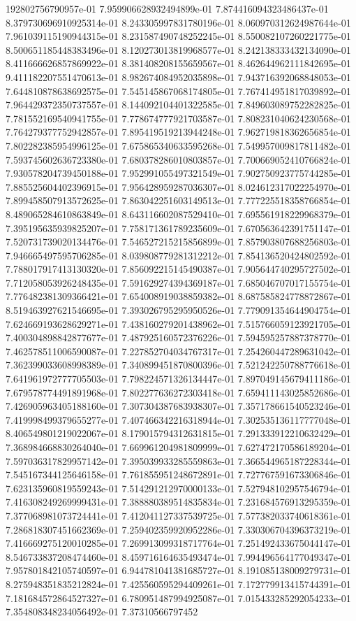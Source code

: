 192802756790957e-01	7.959906628932494899e-01	7.874416094323486437e-01	8.379730696910925314e-01	8.243305997831780196e-01	8.060970312624987644e-01	7.961039115190944315e-01	8.231587490748252245e-01	8.550082107260221775e-01	8.500651185448383496e-01	8.120273013819968577e-01	8.242138333432134090e-01	8.411666626857869922e-01	8.381408208155659567e-01	8.462644962111842695e-01	9.411182207551470613e-01	8.982674084952035898e-01	7.943716392068848053e-01	7.644810878638692575e-01	7.545145867068174805e-01	7.767414951817039892e-01	7.964429372350737557e-01	8.144092104401322585e-01	7.849603089752282825e-01	7.781552169540941755e-01	7.778674777921703587e-01	7.808231040624230568e-01	7.764279377752942857e-01	7.895419519213944248e-01	7.962719818362656854e-01	7.802282385954996125e-01	7.675865340633595268e-01	7.549957009817811482e-01	7.593745602636723380e-01	7.680378286010803857e-01	7.700669052410766824e-01	7.930578204739450188e-01	7.952991055497321549e-01	7.902750923775744285e-01	7.885525604402396915e-01	7.956428959287036307e-01	8.024612317022254970e-01	7.899458507913572625e-01	7.863042251603149513e-01	7.777225518358766854e-01	8.489065284610863849e-01	8.643116602087529410e-01	7.695561918229968379e-01	7.395195635939825207e-01	7.758171361789235609e-01	7.670563642391751147e-01	7.520731739020134476e-01	7.546527215215856899e-01	7.857903807688256803e-01	7.946665497595706285e-01	8.039808779281312212e-01	7.854136520424802592e-01	7.788017917413130320e-01	7.856092215145490387e-01	7.905644740295727502e-01	7.712058053926248435e-01	7.591629274394369187e-01	7.685046707017155754e-01	7.776482381309366421e-01	7.654008919038859382e-01	8.687585824778872867e-01	8.519463927621546695e-01	7.393026795295950526e-01	7.779091354644904754e-01	7.624669193628629271e-01	7.438160279201438962e-01	7.515766059123921705e-01	7.400304898842877677e-01	7.487925160572376226e-01	7.594595257887378770e-01	7.462578511006590087e-01	7.227852704034767317e-01	7.254260447289631042e-01	7.362399033608998389e-01	7.340899451870800396e-01	7.521242250788776618e-01	7.641961972777705503e-01	7.798224571326134447e-01	7.897049145679411186e-01	7.679578774491891968e-01	7.802277636272303418e-01	7.659411143025852686e-01	7.426905963405188160e-01	7.307304387683938307e-01	7.357178661540523246e-01	7.419998499379655277e-01	7.407466342216318944e-01	7.302535136117777048e-01	8.406549801219022067e-01	8.179015794312631815e-01	7.291333912210632429e-01	7.368984668830264040e-01	7.669961204981809999e-01	7.627472170586189204e-01	7.597036317829957142e-01	7.395039933285559863e-01	7.366544965187228344e-01	7.545167344125646158e-01	7.761855951248672891e-01	7.727767591673306846e-01	7.623135960819559243e-01	7.514291212970000133e-01	7.527948102957546794e-01	7.416308249269999431e-01	7.388880389514835834e-01	7.231684576913295359e-01	7.377068981073724441e-01	7.412041127337539725e-01	7.577382033740618361e-01	7.286818307451662369e-01	7.259402359920952286e-01	7.330306704396373219e-01	7.416669275120010285e-01	7.269913099318717764e-01	7.251492433675044147e-01	8.546733837208474460e-01	8.459716164635493474e-01	7.994496564177049347e-01	7.957801842105740597e-01	6.944781041381685727e-01	8.191085138009279731e-01	8.275948351835212824e-01	7.425560595294409261e-01	7.172779913415744391e-01	7.181684572864527327e-01	6.780951487994925087e-01	7.015433285292054233e-01	7.354808348234056492e-01	7.37310566797452